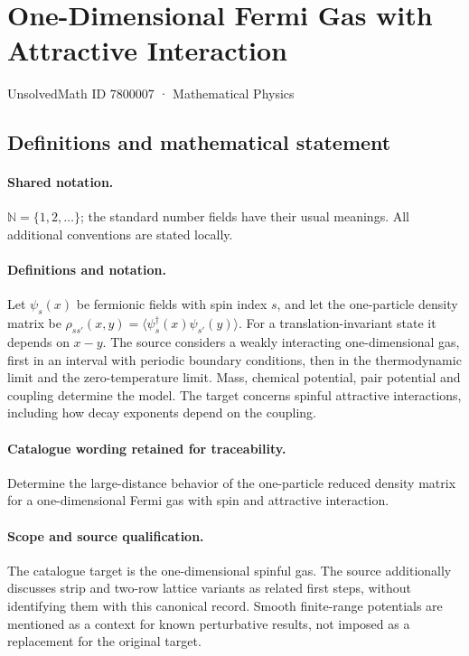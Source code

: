 \documentclass[11pt]{article}
\begin{document}
\setcounter{section}{7800006}
\section{One-Dimensional Fermi Gas with Attractive Interaction}\label{7800007}
{\small UnsolvedMath ID 7800007 · Mathematical Physics}
\subsection{Definitions and mathematical statement}

\paragraph{Shared notation.}$\mathbb N=\{1,2,\ldots\}$; the standard number fields have their usual meanings. All additional conventions are stated locally.


\paragraph{Definitions and notation.}Let $\psi_s(x)$ be fermionic fields with spin index $s$, and let the one-particle density matrix be $\rho_{ss'}(x,y)=\langle\psi_s^\dagger(x)\psi_{s'}(y)\rangle$. For a translation-invariant state it depends on $x-y$. The source considers a weakly interacting one-dimensional gas, first in an interval with periodic boundary conditions, then in the thermodynamic limit and the zero-temperature limit. Mass, chemical potential, pair potential and coupling determine the model. The target concerns spinful attractive interactions, including how decay exponents depend on the coupling.

\paragraph{Catalogue wording retained for traceability.}
Determine the large-distance behavior of the one-particle reduced density matrix for a one-dimensional Fermi gas with spin and attractive interaction.
\paragraph{Scope and source qualification.}The catalogue target is the one-dimensional spinful gas. The source additionally discusses strip and two-row lattice variants as related first steps, without identifying them with this canonical record. Smooth finite-range potentials are mentioned as a context for known perturbative results, not imposed as a replacement for the original target.
\end{document}
